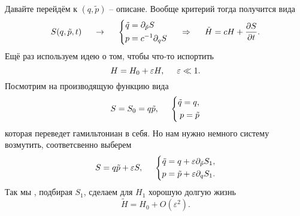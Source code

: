 Давайте перейдём к $(q, \tilde{p})$ -- описане. Вообще критерий тогда получится вида
\begin{equation*}
    S(q, \tilde{p}, t) 
    \hspace{5 mm} \to  \hspace{5 mm}
    \left\{\begin{aligned}
        \tilde{q} &= \partial_{\tilde{p}} S \\
        p &= c^{-1} \partial_q S
    \end{aligned}\right.
    \hspace{0.5cm} \Rightarrow \hspace{0.5cm}
    \tilde{H} = c H + \frac{\partial S}{\partial t}.
\end{equation*}
Ещё раз используем идею о том, чтобы что-то испортить
\begin{equation*}
    H = H_0 + \varepsilon H, \hspace{5 mm} \varepsilon \ll 1.
\end{equation*}
Посмотрим на производящую функцию вида
\begin{equation*}
    S = S_0 = q \tilde{p},
    \hspace{5 mm}
    \left\{\begin{aligned}
        \tilde{q} = q, \\
        p = \tilde{p}
    \end{aligned}\right.
\end{equation*}
которая переведет гамильтониан в себя. Но нам нужно немного систему возмутить, соответсвенно выберем
\begin{equation*}
    S = q \tilde{p} + \varepsilon S,
    \hspace{5 mm}
    \left\{\begin{aligned}
        \tilde{q} = q + \varepsilon \partial_{\tilde{p}} S_1, \\
        p = \tilde{p} + \varepsilon \partial_q S_1.
    \end{aligned}\right.
\end{equation*}
Так мы , подбирая $S_1$, сделаем для $H_1$ хорошую долгую жизнь
\begin{equation*}
    \tilde{H} = H_0 + O(\varepsilon^2).
\end{equation*}


% 